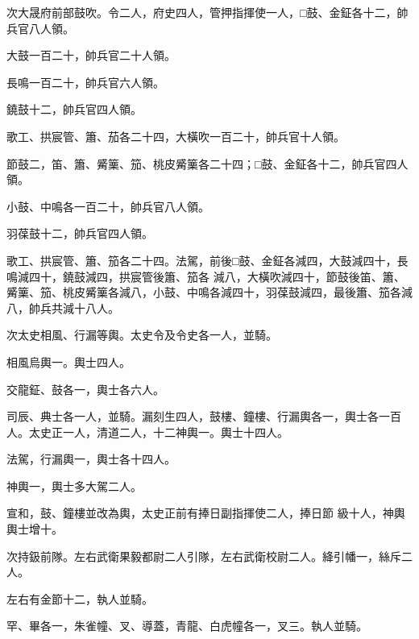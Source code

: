 \begin{pinyinscope}
 次大晟府前部鼓吹。令二人，府史四人，管押指揮使一人，□鼓、金鉦各十二，帥兵官八人領。



 大鼓一百二十，帥兵官二十人領。



 長鳴一百二十，帥兵官六人領。



 鐃鼓十二，帥兵官四人領。



 歌工、拱宸管、簫、茄各二十四，大橫吹一百二十，帥兵官十人領。



 節鼓二，笛、簫、觱篥、笳、桃皮觱篥各二十四；□鼓、金鉦各十二，帥兵官四人領。



 小鼓、中鳴各一百二十，帥兵官八人領。



 羽葆鼓十二，帥兵官四人領。



 歌工、拱宸管、簫、笳各二十四。法駕，前後□鼓、金鉦各減四，大鼓減四十，長鳴減四十，鐃鼓減四，拱宸管後簫、笳各
 減八，大橫吹減四十，節鼓後笛、簫、觱篥、笳、桃皮觱篥各減八，小鼓、中鳴各減四十，羽葆鼓減四，最後簫、笳各減八，帥兵共減十八人。



 次太史相風、行漏等輿。太史令及令史各一人，並騎。



 相風烏輿一。輿士四人。



 交龍鉦、鼓各一，輿士各六人。



 司辰、典士各一人，並騎。漏刻生四人，鼓樓、鐘樓、行漏輿各一，輿士各一百人。太史正一人，清道二人，十二神輿一。輿士十四人。



 法駕，行漏輿一，輿士各十四人。



 神輿一，輿士多大駕二人。



 宣和，鼓、鐘樓並改為輿，太史正前有捧日副指揮使二人，捧日節
 級十人，神輿輿士增十。



 次持鈒前隊。左右武衛果毅都尉二人引隊，左右武衛校尉二人。絳引幡一，絲斥二人。



 左右有金節十二，執人並騎。



 罕、畢各一，朱雀幢、叉、導蓋，青龍、白虎幢各一，叉三。執人並騎。




\end{pinyinscope}

